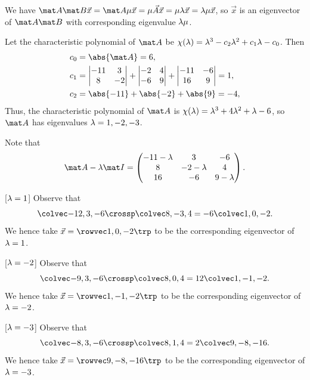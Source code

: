 \begin{solution}
    We have $\mat A \mat B \vec x = \mat A \m \vec x = \m \vec A \vec x = \m \l \vec x = \l \m \vec x$, so $\vec x$ is an eigenvector of $\mat A \mat B$ with corresponding eigenvalue $\lambda \mu$.

    Let the characteristic polynomial of $\mat A$ be $\chi(\lambda) = \lambda^3 - c_2 \lambda^2 + c_1 \lambda - c_0$. Then
    \begin{align*}
        c_0 &= \abs{\mat A} = 6,\\
        c_1 &= \begin{vmatrix}-11 & 3 \\ 8 & -2\end{vmatrix} + \begin{vmatrix}-2 & 4 \\ -6 & 9\end{vmatrix} + \begin{vmatrix}-11 & -6 \\ 16 & 9\end{vmatrix} = 1,\\
        c_2 &= \abs{-11} + \abs{-2} + \abs{9} = -4,
    \end{align*}
    Thus, the characteristic polynomial of $\mat A$ is $\chi(\lambda) = \lambda^3 + 4\lambda^2 + \lambda - 6$, so $\mat A$ has eigenvalues $\lambda = 1, -2, -3$.

    Note that \[\mat A - \l \mat I = \begin{pmatrix}-11-\l & 3 & -6 \\ 8 & -2-\l & 4 \\ 16 & -6 & 9-\l\end{pmatrix}.\]

    [$\lambda = 1$] Observe that \[\cveciii{-12}3{-6} \crossp \cveciii8{-3}{4} = -6 \cveciii10{-2}.\] We hence take $\vec x = \cveciiix10{-2}$ to be the corresponding eigenvector of $\lambda = 1$.

    [$\lambda = -2$] Observe that \[\cveciii{-9}3{-6} \crossp \cveciii8{0}{4} = 12 \cveciii1{-1}{-2}.\] We hence take $\vec x = \cveciiix1{-1}{-2}$ to be the corresponding eigenvector of $\lambda = -2$.

    [$\lambda = -3$] Observe that \[\cveciii{-8}3{-6} \crossp \cveciii8{1}{4} = 2 \cveciii9{-8}{-16}.\] We hence take $\vec x = \cveciiix9{-8}{-16}$ to be the corresponding eigenvector of $\lambda = -3$.


\end{solution}
